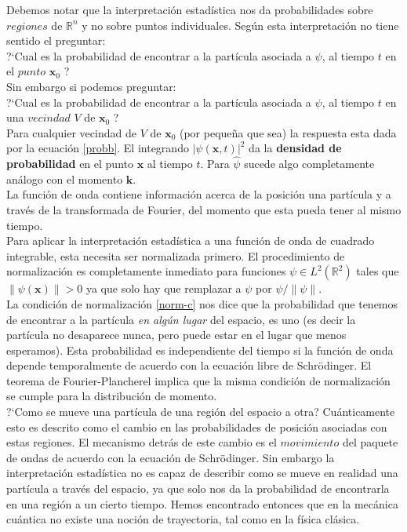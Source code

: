 \documentclass[12pt]{book}
\numberwithin{equation}{chapter}
\def\R{\mathbb{R}}
\def\x{\mathbf{x}}
\def\k{\mathbf{k}}
\begin{document}
\rightline{$\dag$}
\vspace{5 mm}

Debemos notar que la interpretaci\'on estad\'istica nos da probabilidades sobre $regiones$ de $\R^{n}$ y no sobre puntos individuales. Seg\'un esta interpretaci\'on no tiene sentido el preguntar:\\ 

?`Cual es la probabilidad de encontrar a la part\'icula asociada a $\psi$, al tiempo $t$ en el $punto$ $\x_{0}$ ?\\

Sin embargo si podemos preguntar: \\

?`Cual es la probabilidad de encontrar a la part\'icula asociada a $\psi$, al tiempo $t$ en una $vecindad$ $V$ de $\x_{0}$ ?\\

Para cualquier  vecindad de $V$ de $\x_{0}$ (por peque\~na que sea) la respuesta esta dada por la ecuaci\'on \eqref{probb}. El integrando $|\psi(\x,t)|^{2}$ da la {\bf densidad de probabilidad} en el punto $\x$ al tiempo $t$. Para $\hat{\psi}$ sucede algo completamente an\'alogo con el momento $\k$.\\

La funci\'on de onda contiene informaci\'on acerca de la posici\'on una part\'icula y a trav\'es de la transformada de Fourier, del momento que esta pueda tener al mismo tiempo. \\
Para aplicar la interpretaci\'on estad\'istica a una funci\'on de onda de cuadrado integrable, esta necesita ser normalizada primero. El procedimiento de normalizaci\'on es completamente inmediato para funciones $\psi \in L^{2}(\R^{2})$ tales que $\|\psi(\x)\| > 0$ ya que solo hay que remplazar a $\psi$ por $\psi /\|\psi \| $. \\

La condici\'on de normalizaci\'on \eqref{norm-c} nos dice que la probabilidad que tenemos de encontrar a la part\'icula \emph{ en alg\'un lugar } del espacio, es uno (es decir la part\'icula no desaparece nunca, pero puede estar en el lugar que menos esperamos). Esta probabilidad es independiente del tiempo si la funci\'on de onda depende temporalmente de acuerdo con la ecuaci\'on libre de Schr\"odinger. El teorema de Fourier-Plancherel implica que la misma condici\'on de normalizaci\'on se cumple para la distribuci\'on de momento. \\

?`Como se mueve una part\'icula de una regi\'on del espacio a otra? Cu\'anticamente esto es descrito como el cambio en las probabilidades de posici\'on asociadas con estas regiones. El mecanismo detr\'as de este cambio es el $movimiento$ del paquete de ondas de acuerdo con la ecuaci\'on de Schr\"odinger. Sin embargo la interpretaci\'on estad\'istica no es capaz de describir como se mueve en realidad una part\'icula a trav\'es del espacio, ya que solo nos da la probabilidad de encontrarla en una regi\'on a un cierto tiempo. Hemos encontrado entonces que en la mec\'anica cu\'antica no existe una noci\'on de trayectoria, tal como en la f\'isica cl\'asica.  
\end{document}
